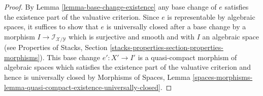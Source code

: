 \documentclass[10pt,a4paper]{amsart}
\theoremstyle{plain}
\theoremstyle{definition}
\theoremstyle{remark}
\numberwithin{equation}{subsection}
\begin{document}
\begin{proof}
\medskip\noindent
By Lemma \ref{lemma-base-change-existence} any base change of $e$
satisfies the existence part of the valuative criterion.
Since $e$ is representable by algebraic spaces, it suffices to
show that $e$ is universally closed after a base change
by a morphism $I \to \mathcal{I}_{\mathcal{X}/\mathcal{Y}}$
which is surjective and smooth and with $I$ an algebraic space
(see Properties of Stacks, Section
\ref{stacks-properties-section-properties-morphisms}).
This base change $e' : X' \to I'$ is a quasi-compact
morphism of algebraic spaces which
satisfies the existence part of the valuative criterion
and hence is universally closed by
Morphisms of Spaces, Lemma
\ref{spaces-morphisms-lemma-quasi-compact-existence-universally-closed}.
\end{proof}
\end{document}
